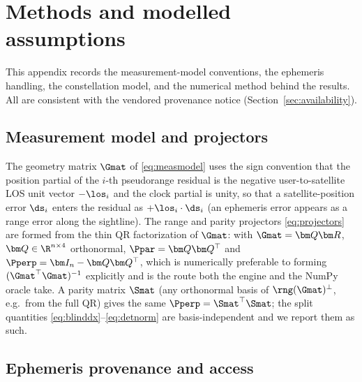 \section{Methods and modelled assumptions}
\label{app:methods}

This appendix records the measurement-model conventions, the ephemeris handling, the
constellation model, and the numerical method behind the results. All are consistent
with the vendored provenance notice (Section~\ref{sec:availability}).

\subsection{Measurement model and projectors}
\label{app:model}

The geometry matrix $\Gmat$ of \eqref{eq:measmodel} uses the sign convention that the
position partial of the $i$-th pseudorange residual is the negative user-to-satellite
LOS unit vector $-\los_i$ and the clock partial is unity, so that a satellite-position
error $\ds_i$ enters the residual as $+\los_i\cdot\ds_i$ (an ephemeris error appears as
a range error along the sightline). The range and parity projectors
\eqref{eq:projectors} are formed from the thin QR factorization of $\Gmat$: with
$\Gmat=\bm Q\bm R$, $\bm Q\in\R^{n\times4}$ orthonormal, $\Ppar=\bm Q\bm Q^\top$ and
$\Pperp=\bm I_n-\bm Q\bm Q^\top$, which is numerically preferable to forming
$(\Gmat^\top\Gmat)^{-1}$ explicitly and is the route both the engine and the NumPy oracle
take. A parity matrix $\Smat$ (any orthonormal basis of $\rng(\Gmat)^\perp$, e.g.\ from
the full QR) gives the same $\Pperp=\Smat^\top\Smat$; the split quantities
\eqref{eq:blinddx}--\eqref{eq:detnorm} are basis-independent and we report them as such.

\subsection{Ephemeris provenance and access}
\label{app:provenance}


